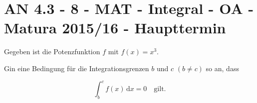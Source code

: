 \section{AN 4.3 - 8 - MAT - Integral - OA - Matura 2015/16 - Haupttermin}

\begin{beispiel}[AN 4.3]{1} %
Gegeben ist die Potenzfunktion $f$ mit $f(x) = x^3$.\leer

Gin eine Bedingung für die Integrationsgrenzen $b$ und $c$ $(b \neq c)$ so an, dass

$$\int_{b}^{c}\! f(x)\, \mathrm{d}x=0 \quad \text{gilt.}$$ 


\end{beispiel}